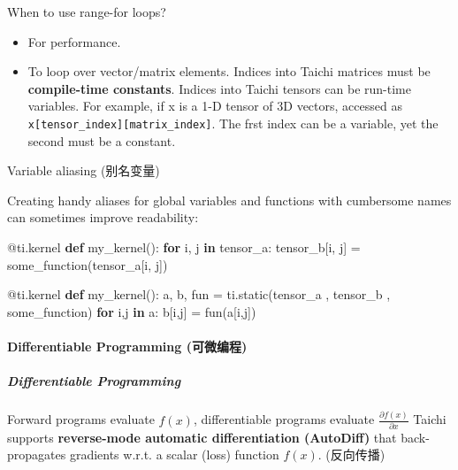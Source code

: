 \documentclass[11pt]{article}
\providecommand{\tightlist}{%
      \setlength{\itemsep}{0pt}\setlength{\parskip}{0pt}}
\newenvironment{Shaded}{}{}
\newcommand{\KeywordTok}[1]{\textcolor[rgb]{0.00,0.44,0.13}{\textbf{{#1}}}}
\newcommand{\NormalTok}[1]{{#1}}
\newcommand{\ControlFlowTok}[1]{\textcolor[rgb]{0.00,0.44,0.13}{\textbf{{#1}}}}
\newcommand{\OperatorTok}[1]{\textcolor[rgb]{0.40,0.40,0.40}{{#1}}}
\newcommand{\AttributeTok}[1]{\textcolor[rgb]{0.49,0.56,0.16}{{#1}}}
\begin{document}
    When to use range-for loops?

\begin{itemize}
\tightlist
\item
  For performance.
\item
  To loop over vector/matrix elements. Indices into Taichi matrices must
  be \textbf{compile-time constants}. Indices into Taichi tensors can be
  run-time variables. For example, if x is a 1-D tensor of 3D vectors,
  accessed as \texttt{x{[}tensor\_index{]}{[}matrix\_index{]}}. The frst
  index can be a variable, yet the second must be a constant.
\end{itemize}

Variable aliasing (别名变量)

Creating handy aliases for global variables and functions with
cumbersome names can sometimes improve readability:

\begin{Shaded}
\begin{Highlighting}[]
\AttributeTok{@ti.kernel}
    \KeywordTok{def}\NormalTok{ my\_kernel():}
        \ControlFlowTok{for}\NormalTok{ i, j }\KeywordTok{in}\NormalTok{ tensor\_a:}
\NormalTok{            tensor\_b[i, j] }\OperatorTok{=}\NormalTok{ some\_function(tensor\_a[i, j])}
\end{Highlighting}
\end{Shaded}

\begin{Shaded}
\begin{Highlighting}[]
\AttributeTok{@ti.kernel}
\KeywordTok{def}\NormalTok{ my\_kernel():}
\NormalTok{    a, b, fun }\OperatorTok{=}\NormalTok{ ti.static(tensor\_a , tensor\_b , some\_function)}
    \ControlFlowTok{for}\NormalTok{ i,j }\KeywordTok{in}\NormalTok{ a:}
\NormalTok{        b[i,j] }\OperatorTok{=}\NormalTok{ fun(a[i,j])}
\end{Highlighting}
\end{Shaded}

    \hypertarget{differentiable-programming-ux53efux5faeux7f16ux7a0b}{%
\paragraph{Differentiable Programming
(可微编程)}\label{differentiable-programming-ux53efux5faeux7f16ux7a0b}}

\hypertarget{differentiable-programming}{%
\subparagraph{Differentiable
Programming}\label{differentiable-programming}}

Forward programs evaluate \(f(x)\), differentiable programs evaluate
\(\frac{\partial f(x)}{\partial x}\) Taichi supports
\textbf{reverse-mode automatic differentiation (AutoDiff)} that
back-propagates gradients w.r.t. a scalar (loss) function \(f(x)\).
(反向传播)
\end{document}
